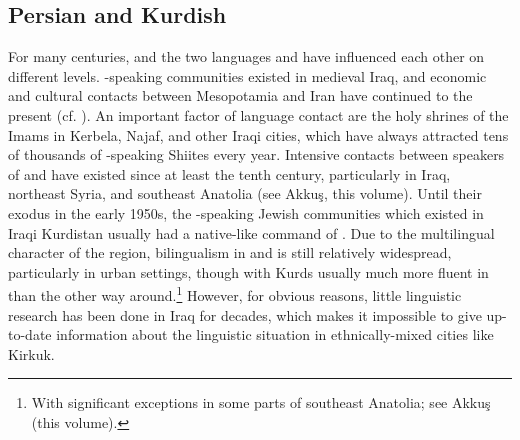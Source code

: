 \documentclass[output=paper]{langsci/langscibook}
\begin{document}
  \subsection{Persian and Kurdish} \label{persian} 
For many centuries,  and the two   languages  and  have influenced each other on different levels. -speaking communities existed in medieval Iraq, and economic and cultural contacts between Mesopotamia and Iran have continued to the present (cf. \citealt{Gazsi2011}). An important factor of language contact are the holy shrines of the Imams in Kerbela, Najaf, and other Iraqi cities, which have always attracted tens of thousands of -speaking Shiites every year. Intensive contacts between speakers of  and  have existed since at least the tenth century, particularly in  Iraq, northeast Syria, and southeast {Anatolia} (see Akkuş, this volume). Until their exodus in the early 1950s, the -speaking Jewish communities which existed in Iraqi Kurdistan usually had a native-like command of  \citep[12]{Jastrow1990chapter}. Due to the multilingual character of the region, {bilingualism} in  and  is still relatively widespread, particularly in urban settings, though with {Kurds} usually much more fluent in  than the other way around.\footnote{With significant exceptions in some parts of southeast {Anatolia}; see Akkuş (this volume).} However, for obvious reasons, little linguistic research has been done in Iraq for decades, which makes it impossible to give up-to-date information about the linguistic situation in ethnically-mixed cities like Kirkuk.
\end{document}
